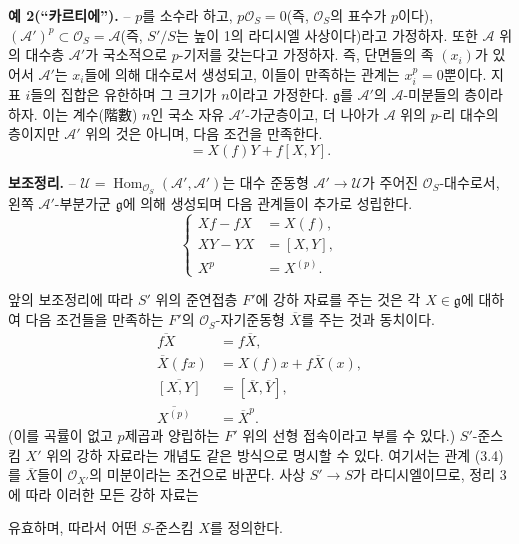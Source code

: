 \documentclass[11pt,twoside,openany]{book}
\numberwithin{equation}{section}
\newcommand{\sourceunit}{front}
\newcommand{\src}[1]{%
  \phantomsection\hypertarget{src:\sourceunit:#1}{}%
  \marginpar{\raggedleft\footnotesize\sffamily #1}%
}
\theoremstyle{plain}
\theoremstyle{definition}
\theoremstyle{remark}
\begin{document}
\textbf{예 2(“카르티에”).} -- $p$를 소수라 하고,
$p\mathcal O_S=0$(즉, $\mathcal O_S$의 표수가 $p$이다),
$(\mathcal A')^p\subset\mathcal O_S=\mathcal A$(즉, $S'/S$는 높이 1의
라디시엘 사상이다)라고 가정하자. 또한 $\mathcal A$ 위의 대수층
$\mathcal A'$가 국소적으로 $p$-기저를 갖는다고 가정하자. 즉, 단면들의
족 $(x_i)$가 있어서 $\mathcal A'$는 $x_i$들에 의해 대수로서 생성되고,
이들이 만족하는 관계는 $x_i^p=0$뿐이다. 지표 $i$들의 집합은 유한하며
그 크기가 $n$이라고 가정한다. $\mathfrak g$를 $\mathcal A'$의
$\mathcal A$-미분들의 층이라 하자. 이는 계수(階數) $n$인 국소 자유
$\mathcal A'$-가군층이고, 더 나아가 $\mathcal A$ 위의 $p$-리 대수의
층이지만 $\mathcal A'$ 위의 것은 아니며, 다음 조건을 만족한다.
\begin{equation}
  [X,fY]=X(f)Y+f[X,Y].
  \tag{3.5}
\end{equation}

\textbf{보조정리.} -- $\mathcal U=
\operatorname{Hom}_{\mathcal O_S}(\mathcal A',\mathcal A')$는 대수 준동형
$\mathcal A'\longrightarrow\mathcal U$가 주어진 $\mathcal O_S$-대수로서,
왼쪽 $\mathcal A'$-부분가군 $\mathfrak g$에 의해 생성되며 다음 관계들이
추가로 성립한다.
\begin{equation}
  \left\{
  \begin{aligned}
    Xf-fX&=X(f),\\
    XY-YX&=[X,Y],\\
    X^p&=X^{(p)}.
  \end{aligned}
  \right.
  \tag{3.6}
\end{equation}

앞의 보조정리에 따라 $S'$ 위의 준연접층 $F'$에 강하 자료를 주는 것은
각 $X\in\mathfrak g$에 대하여 다음 조건들을 만족하는 $F'$의
$\mathcal O_S$-자기준동형 $\overline X$를 주는 것과 동치이다.
\begin{align}
  \overline{fX}&=f\overline X, \tag{3.7}\\
  \overline X(fx)&=X(f)x+f\overline X(x), \tag{3.8}\\
  \overline{[X,Y]}&=[\overline X,\overline Y], \tag{3.9}\\
  \overline{X^{(p)}}&=\overline X^p. \tag{3.10}
\end{align}
(이를 곡률이 없고 $p$제곱과 양립하는 $F'$ 위의 선형 접속이라고 부를 수
있다.) $S'$-준스킴 $X'$ 위의 강하 자료라는 개념도 같은 방식으로 명시할 수
있다. 여기서는 관계 (3.4)를 $\overline X$들이 $\mathcal O_{X'}$의
미분이라는 조건으로 바꾼다. 사상 $S'\longrightarrow S$가 라디시엘이므로,
정리 3에 따라 이러한 모든 강하 자료는

\src{322}
유효하며, 따라서 어떤 $S$-준스킴 $X$를 정의한다.
\end{document}
